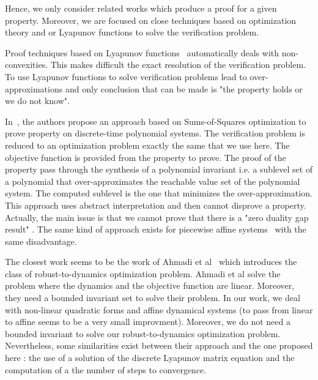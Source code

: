 \documentclass[10pt]{article}
\begin{document}
Hence, we only consider related works which produce a proof for a given property. Moreover, we are focused on close techniques based on optimization theory and or Lyapunov functions to solve the verification problem. 

Proof techniques based on Lyapunov functions~\cite{roozbehani2013optimization,blanchini2009lyapunov} automatically deals with non-convexities. This makes difficult the exact resolution of the verification problem. To use Lyapunov functions to solve verification problems lead  to over-approximations and only conclusion that can be made is "the property holds or we do not know".

In~\cite{adje2015property}, the authors propose  an approach based on Sums-of-Squares optimization to prove property on discrete-time polynomial systems. The verification problem is reduced to an optimization problem exactly the same that we use here.  The objective function is provided from the property to prove. The proof of the property pass through the synthesis of a polynomial invariant i.e.  a sublevel set of a polynomial that over-approximates the reachable value set of the polynomial system. The computed sublevel is the one that minimizes the over-approximation. This approach uses abstract interpretation and then cannot disprove a property. Actually, the main issue is that we cannot prove that there is a "zero duality gap result" . The same kind of approach exists for piecewise affine systems~\cite{10.1007/978-3-319-54292-8_2} with the same disadvantage. 


The closest work seems to be the work of Ahmadi et al~\cite{7403149,ahmadi2018robust} which introduces the class of robust-to-dynamics optimization problem. Ahmadi et al solve the problem where the dynamics and the objective function are linear. Moreover, they need a bounded invariant set to solve their problem. In our work, we deal with non-linear quadratic  forms and affine dynamical systems (to pass from linear to affine seems to be a very small improvment).  Moreover, we do not need a bounded invariant to solve our robust-to-dynamics optimization problem.  Nevertheless, some similarities exist between their approach and the one proposed here : the use of a solution of the discrete Lyapunov matrix equation and the computation of a the number of steps to convergence.  

\end{document}
